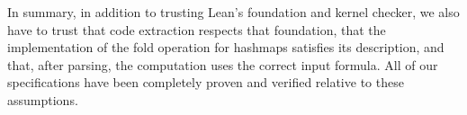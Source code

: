 In summary, in addition to trusting Lean's foundation and kernel checker,
we also have to trust that code extraction respects that foundation,
that the implementation of the fold operation for hashmaps satisfies its description,
and that, after parsing, the computation uses the correct input formula.
All of our specifications have been completely proven and verified relative to these assumptions.

